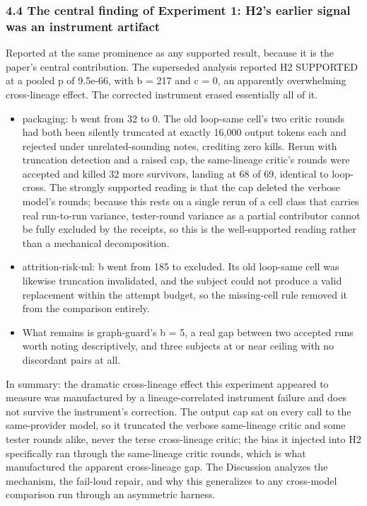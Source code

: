 \documentclass[
  11pt,
]{article}
\providecommand{\tightlist}{%
  \setlength{\itemsep}{0pt}\setlength{\parskip}{0pt}}
\begin{document}
\subsubsection{4.4 The central finding of Experiment 1: H2's earlier
signal was an instrument
artifact}\label{the-central-finding-of-experiment-1-h2s-earlier-signal-was-an-instrument-artifact}

Reported at the same prominence as any supported result, because it is
the paper's central contribution. The superseded analysis reported H2
SUPPORTED at a pooled p of 9.5e-66, with b = 217 and c = 0, an
apparently overwhelming cross-lineage effect. The corrected instrument
erased essentially all of it.

\begin{itemize}
\tightlist
\item
  packaging: b went from 32 to 0. The old loop-same cell's two critic
  rounds had both been silently truncated at exactly 16,000 output
  tokens each and rejected under unrelated-sounding notes, crediting
  zero kills. Rerun with truncation detection and a raised cap, the
  same-lineage critic's rounds were accepted and killed 32 more
  survivors, landing at 68 of 69, identical to loop-cross. The strongly
  supported reading is that the cap deleted the verbose model's rounds;
  because this rests on a single rerun of a cell class that carries real
  run-to-run variance, tester-round variance as a partial contributor
  cannot be fully excluded by the receipts, so this is the
  well-supported reading rather than a mechanical decomposition.
\item
  attrition-risk-ml: b went from 185 to excluded. Its old loop-same cell
  was likewise truncation invalidated, and the subject could not produce
  a valid replacement within the attempt budget, so the missing-cell
  rule removed it from the comparison entirely.
\item
  What remains is graph-guard's b = 5, a real gap between two accepted
  runs worth noting descriptively, and three subjects at or near ceiling
  with no discordant pairs at all.
\end{itemize}

In summary: the dramatic cross-lineage effect this experiment appeared
to measure was manufactured by a lineage-correlated instrument failure
and does not survive the instrument's correction. The output cap sat on
every call to the same-provider model, so it truncated the verbose
same-lineage critic and some tester rounds alike, never the terse
cross-lineage critic; the bias it injected into H2 specifically ran
through the same-lineage critic rounds, which is what manufactured the
apparent cross-lineage gap. The Discussion analyzes the mechanism, the
fail-loud repair, and why this generalizes to any cross-model comparison
run through an asymmetric harness.
\end{document}
